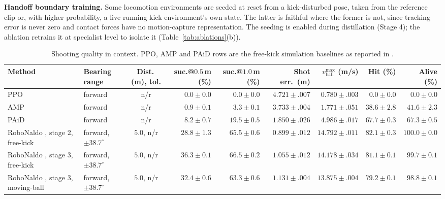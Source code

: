 \documentclass[letterpaper, 10 pt, conference]{ieeeconf}  %
\begin{document}
\textbf{Handoff boundary training.} Some locomotion environments are seeded
at reset from a kick-disturbed pose, taken from the reference clip or, with
higher probability, a live running kick environment's own state. The latter is
faithful where the former is not, since tracking error is never zero and
contact forces have no motion-capture representation.
The seeding is enabled during distillation (Stage 4); the ablation retrains it at
specialist level to isolate it (Table~\ref{tab:ablations}(b)).


\begin{table}[t]
\centering
\caption{Shooting quality in context. PPO, AMP and PAiD rows are the
free-kick simulation baselines as reported in \cite{robonaldo}.}
\label{tab:context}
\scriptsize
\setlength{\tabcolsep}{2.8pt}
\begin{tabular}{@{}llcrrrrrr@{}}
\toprule
Method & Bearing range & Dist.\,(m), tol. & suc.@$0.5$\,m (\%) & suc.@$1.0$\,m (\%) & Shot err.\ (m) & $v^{\max}_{\mathrm{ball}}$ (m/s) & Hit (\%) & Alive (\%) \\
\midrule
PPO \cite{ppo}                                   & forward & n/r & $0.0{\pm}0.0$  & $0.0{\pm}0.0$  & $4.721{\pm}.007$ & $0.780{\pm}.003$  & $0.0{\pm}0.0$  & $0.0{\pm}0.0$ \\
AMP \cite{amp}                                   & forward & n/r & $0.9{\pm}0.1$  & $3.3{\pm}0.1$  & $3.733{\pm}.004$ & $1.771{\pm}.051$  & $38.6{\pm}2.8$ & $41.6{\pm}2.3$ \\
PAiD \cite{paid}                                 & forward & n/r & $8.2{\pm}0.7$  & $19.5{\pm}0.5$ & $1.850{\pm}.026$ & $4.986{\pm}.017$  & $67.7{\pm}0.3$ & $67.3{\pm}0.5$ \\
RoboNaldo \cite{robonaldo}, stage 2, free-kick    & forward, $\pm38.7^\circ$ & $5.0$, n/r & $28.8{\pm}1.3$ & $65.5{\pm}0.6$ & $0.899{\pm}.012$ & $\mathbf{14.792{\pm}.011}$ & $82.1{\pm}0.3$ & $\mathbf{100.0{\pm}0.0}$ \\
RoboNaldo \cite{robonaldo}, stage 3, free-kick    & forward, $\pm38.7^\circ$ & $5.0$, n/r & $36.3{\pm}0.1$ & $66.5{\pm}0.2$ & $1.055{\pm}.012$ & $14.178{\pm}.034$ & $81.1{\pm}0.1$ & $99.7{\pm}0.1$ \\
RoboNaldo \cite{robonaldo}, stage 3, moving-ball  & forward, $\pm38.7^\circ$ & $5.0$, n/r & $32.4{\pm}0.6$ & $63.3{\pm}0.6$ & $1.131{\pm}.004$ & $13.875{\pm}.004$ & $79.2{\pm}0.1$ & $98.8{\pm}0.1$ \\

\end{tabular}
\end{table}
\end{document}
